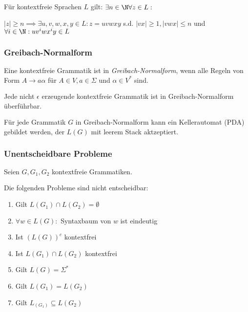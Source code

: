 Für kontextfreie Sprachen $L$ gilt: $\exists n \in \N \forall z \in L :$

\spacing

$|z| \geq n \implies \exists u,v,w,x,y \in L : z=uvwxy$ s.d. $|vx| \geq 1, |vwx| \leq n$ und $\forall i \in \N : uv^iwx^iy \in L$

\subsubsection*{Greibach-Normalform}

Eine kontextfreie Grammatik ist in \emph{Greibach-Normalform}, wenn alle Regeln von Form $A \to a\alpha$ für $A \in V, a \in \Sigma$ und $\alpha \in V^*$ sind.

\spacing

Jede nicht $\epsilon$ erzeugende kontextfreie Grammatik ist in Greibach-Normalform überführbar.

\spacing

Für jede Grammatik $G$ in Greibach-Normalform kann ein Kellerautomat (PDA) gebildet werden, der $L(G)$ mit leerem Stack aktzeptiert.

\subsubsection*{Unentscheidbare Probleme}

Seien $G, G_1, G_2$ kontextfreie Grammatiken.

Die folgenden Probleme sind nicht entscheidbar:

\begin{enumerate}
\item Gilt $L(G_1) \cap L(G_2) = \emptyset$
\item $\forall w \in L(G) : $ Syntaxbaum von $w$ ist eindeutig
\item Ist $(L(G))^c$ kontextfrei
\item Ist $L(G_1) \cap L(G_2)$ kontextfrei
\item Gilt $L(G) = \Sigma^*$
\item Gilt $L(G_1) = L(G_2)$
\item Gilt $L_(G_1) \subseteq L(G_2)$
\end{enumerate}
